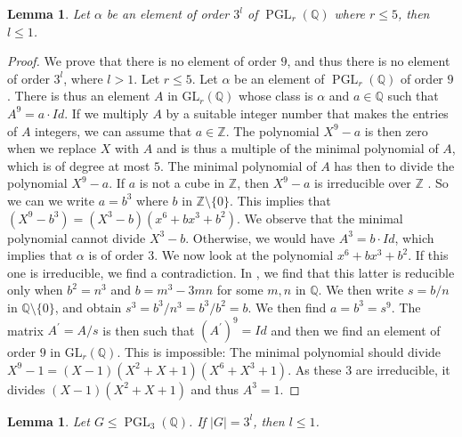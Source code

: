 \documentclass[leqno,12pt]{amsart} %
\newtheorem{lem}[thm]{Lemma}
\newcommand{\Z}{\ensuremath{\mathbb{Z}}}
\newcommand{\Q}{\ensuremath{\mathbb{Q} }}
\DeclareMathOperator{\PGL}{PGL}
\begin{document}
\begin{lem}\label{element3}
    Let $\alpha$ be an element of order $3^l$ of $\PGL_r(\Q )$ where $r\le 5$, then $l\le 1$.
\end{lem}
 
\begin{proof}  We prove that there is no element of order $9$, and thus there is no element of order $3^l$, where $l> 1$. Let $r\le 5$. Let $\alpha$ be an element of $\PGL _r(\Q )$ of order $9$. There is thus an element $A$ in $\mathrm{GL}_r(\Q )$ whose class is $\alpha$ and  $a\in \Q $ such that $A^9= a \cdot Id$. If we multiply $A$ by a suitable integer number that makes the entries of $A$ integers, we can assume that $a\in \Z $. The polynomial $X^9-a$ is then zero when we replace $X$ with $A$ and is thus a multiple of the minimal polynomial of $A$, which is of degree at most $5$. The minimal polynomial of $A$ has then to divide the polynomial $X^9-a$. If $a$ is not a cube in $\Z $, then $X^9-a$ is irreducible over $\Z $ \cite[Theorem 9.1]{MR1878556}. So we can we write $a=b^3$ where $b$ in $\Z \setminus\{0\}$. This implies that $(X^9-b^3)=(X^3-b)(x^6+bx^3+b^2)$. We observe that the minimal polynomial cannot divide $X^3-b$. Otherwise, we would have $A^3=b\cdot Id$, which implies that $\alpha$ is of order $3$. We now look at the polynomial $x^6+bx^3+b^2$. If this one is irreducible, we find a contradiction. In  \cite[Theorem 3.1]{MR3657411}, we find that this latter is reducible only when $b^2=n^3$ and $b=m^3-3mn$ for some $m,n$ in $\Q $. We then write $s=b/n$ in $\Q \setminus\{0\}$, and obtain $s^3=b^3/n^3=b^3/b^2=b$. We then find $a=b^3=s^9$. The matrix $A
^{\prime}=A/s$ is then such that $(A^{\prime})^9=Id$ and then we find an element of order $9$ in $\mathrm{GL}_r(\Q )$. This is impossible: The minimal polynomial should divide $X^9-1=(X - 1)(X^2 + X + 1)(X^6 + X^3 + 1)$. As these $3$ are irreducible, it divides $(X-1)(X^2+X+1)$ and thus $A^3=1$.
\end{proof}
 
\begin{lem}\label{lem:PGL3bound3}
    Let $G\le \PGL_3(\Q)$. If $\mid G\mid =3^l$, then $l\le1$.
\end{lem}
 
\end{document}
